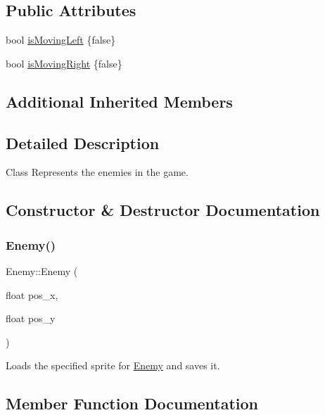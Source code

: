 \subsection*{Public Attributes}
\begin{DoxyCompactItemize}
\item 
bool \hyperlink{classEnemy_a2d4bfba6681a78723c61c284a5e1f2d5}{is\+Moving\+Left} \{false\}
\item 
bool \hyperlink{classEnemy_a69ab0772337c6de349a6a412d10876e7}{is\+Moving\+Right} \{false\}
\end{DoxyCompactItemize}
\subsection*{Additional Inherited Members}


\subsection{Detailed Description}
Class Represents the enemies in the game. 

\subsection{Constructor \& Destructor Documentation}
\mbox{\label{classEnemy_a3aca7827da68a391100d2bc1a4873625}} 
\subsubsection{\texorpdfstring{Enemy()}{Enemy()}}
{\footnotesize\ttfamily Enemy\+::\+Enemy (\begin{DoxyParamCaption}\item[{float}]{pos\+\_\+x,  }\item[{float}]{pos\+\_\+y }\end{DoxyParamCaption})}

Loads the specified sprite for \hyperlink{classEnemy}{Enemy} and saves it. 

\subsection{Member Function Documentation}
\mbox{\label{classEnemy_a8b36ae5a6d6fd18d0064139ce92e7661}} 
